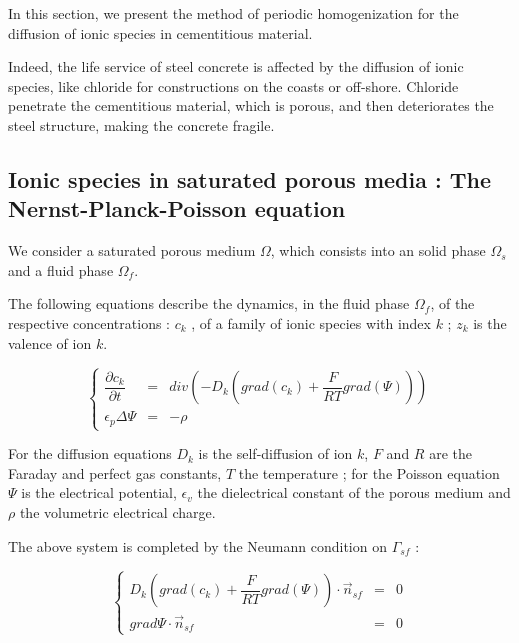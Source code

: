 In this section, we present the method of periodic homogenization for the diffusion of ionic species in cementitious material.

\par
Indeed, the life service of steel concrete is affected by the diffusion of ionic species, %
like chloride for constructions on the coasts or off-shore. %
Chloride penetrate the cementitious material, which is porous, and then deteriorates the steel structure, making the concrete fragile.

\subsection{Ionic species in saturated porous media : The Nernst-Planck-Poisson equation}

We consider a saturated porous medium $\Omega$, which consists into an solid phase $\Omega_s$ and a fluid phase $\Omega_f$.

\par
The following equations describe the dynamics, in the fluid phase $\Omega_f$, of the respective concentrations : $c_k$ , of a family of ionic species with index $k$ ; %
$z_k$ is the valence of ion $k$.

\begin{equation}\label{npp_f}
\left\{%
\begin{array}{lcl}
\dfrac{\partial{c_k}}{\partial{t}}&=&div\left(-D_k\left(grad(c_k)+\dfrac{F}{RT}grad(\Psi)\right)\right)\\
\epsilon_p \Delta \Psi&=&-\rho
\end{array}
\right.
\end{equation}

For the diffusion equations $D_k$ is the self-diffusion of ion $k$, $F$ and $R$ are the Faraday and perfect gas constants, $T$ the temperature ; %
for the Poisson equation $\Psi$ is the electrical potential, $\epsilon_v$ the dielectrical constant of the porous medium and $\rho$ the volumetric electrical charge.

\par
The above system is completed by the Neumann condition on $\Gamma_{sf}$ :

\begin{equation}\label{npp_sf}
\left\{%
\begin{array}{lcr}
D_k\left(grad(c_k)+\dfrac{F}{RT}grad(\Psi)\right)\cdot \vec{n}_{sf}&=&0\\
grad \Psi\cdot \vec{n}_{sf}&=&0
\end{array}
\right.
\end{equation}

